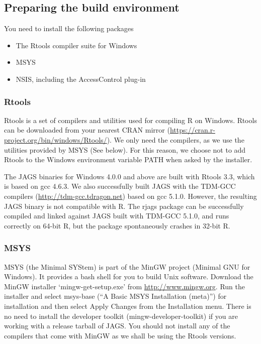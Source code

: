 \documentclass[11pt, a4paper, titlepage]{article}
\newcommand{\JAGS}{\textsf{JAGS}}
\newcommand{\code}[1]{{\bgroup{\normalfont\ttfamily #1}\egroup}}
\newcommand{\file}[1]{{`\normalfont\textsf{#1}'}}
\begin{document}
\subsection{Preparing the build environment}

You need to install the following packages
\begin{itemize}
\item The Rtools compiler suite for Windows
\item MSYS  
\item NSIS, including the AccessControl plug-in  
\end{itemize}

\subsubsection{Rtools}

Rtools is a set of compilers and utilities used for compiling R on
Windows. Rtools can be downloaded from your nearest CRAN mirror
(\url{https://cran.r-project.org/bin/windows/Rtools/}).  We only need
the compilers, as we use the utilities provided by MSYS (See below).
For this reason, we choose not to add Rtools to the Windows environment
variable \code{PATH} when asked by the installer.

The JAGS binaries for Windows 4.0.0 and above are built with Rtools
3.3, which is based on gcc 4.6.3. We also successfully built JAGS with
the TDM-GCC compilers (\url{http://tdm-gcc.tdragon.net}) based on gcc
5.1.0. However, the resulting JAGS binary is not compatible with
R. The rjags package can be successfully compiled and linked against
JAGS built with TDM-GCC 5.1.0, and runs correctly on 64-bit R, but
the package spontaneously crashes in 32-bit R.

\subsubsection{MSYS}

MSYS (the Minimal SYStem) is part of the MinGW project (Minimal GNU
for Windows). It provides a bash shell for you to build Unix
software. Download the MinGW installer \file{mingw-get-setup.exe} from
\url{http://www.mingw.org}.  Run the installer and select
\code{msys-base} (``A Basic MSYS Installation (meta)'') for
installation and then select \code{Apply Changes} from the
\code{Installation} menu. There is no need to install the developer
toolkit (\code{mingw-developer-toolkit}) if you are working with a
release tarball of \JAGS.  You should not install any of the compilers
that come with MinGW as we shall be using the Rtools versions.
\end{document}
